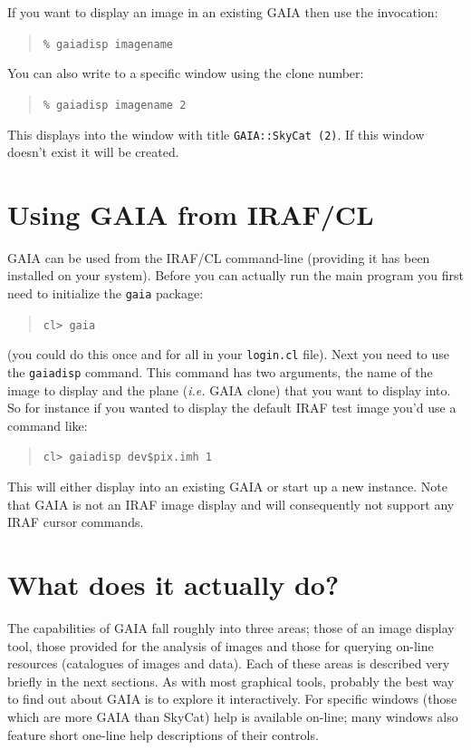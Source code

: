 \documentclass[twoside,11pt]{article}
\newcommand{\xlabel}[1]{}
\renewcommand{\_}{\texttt{\symbol{95}}}
\newcommand{\mytt}[1]{{\tt{#1}}}
\begin{document}
If you want to display an image in an existing GAIA then use the
invocation:
\begin{quote}
\mytt{\% gaiadisp image\_name}
\end{quote}
You can also write to a specific window using the clone number:
\begin{quote}
\mytt{\% gaiadisp image\_name 2}
\end{quote}
This displays into the window with title \mytt{GAIA::SkyCat (2)}. If
this window doesn't exist it will be created.

\section{\xlabel{using_gaia_from_irafcl}Using GAIA from IRAF/CL}

GAIA can be used from the IRAF/CL command-line (providing it has been
installed on your system). Before you can actually run the main program
you first need to initialize the \mytt{gaia} package:
\begin{quote}
\mytt{cl> gaia}
\end{quote}
(you could do this once and for all in your \mytt{login.cl}
file). Next you need to use the \mytt{gaiadisp} command. This command
has two arguments, the name of the image to display and the plane
({\em i.e.} GAIA clone) that you want to display into. So for instance
if you wanted to display the default IRAF test image you'd use a
command like:
\begin{quote}
\mytt{cl> gaiadisp dev\$pix.imh 1}
\end{quote}
This will either display into an existing GAIA or start up a new
instance. Note that GAIA is not an IRAF image display and will
consequently not support any IRAF cursor commands.

\section{\xlabel{what_does_it_actually_do}What does it actually do?}

The capabilities of GAIA fall roughly into three areas; those of an
image display tool, those provided for the analysis of images and those
for querying on-line resources (catalogues of images and data). Each
of these areas is described very briefly in the next sections. As with
most graphical tools, probably the best way to find out about GAIA is
to explore it interactively. For specific windows (those which are
more GAIA than SkyCat) help is available on-line; many windows also
feature short one-line help descriptions of their controls.
\end{document}
